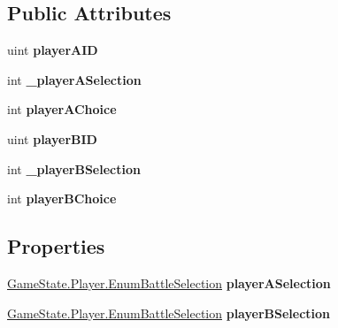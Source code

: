 \subsection*{Public Attributes}
\begin{DoxyCompactItemize}
\item 
\hypertarget{class_event_battle_prompt_selection_a3a3a30b00d2cbb9e1fd3658667b5f0bf}{uint {\bfseries player\-A\-I\-D}}\label{class_event_battle_prompt_selection_a3a3a30b00d2cbb9e1fd3658667b5f0bf}

\item 
\hypertarget{class_event_battle_prompt_selection_adb27194b379be6543169a2a56e47eabb}{int {\bfseries \-\_\-player\-A\-Selection}}\label{class_event_battle_prompt_selection_adb27194b379be6543169a2a56e47eabb}

\item 
\hypertarget{class_event_battle_prompt_selection_a2a6c2af764a1838c48c1ecafdfc0a0f0}{int {\bfseries player\-A\-Choice}}\label{class_event_battle_prompt_selection_a2a6c2af764a1838c48c1ecafdfc0a0f0}

\item 
\hypertarget{class_event_battle_prompt_selection_ab50685401b7d5cc0491616b1515a66cb}{uint {\bfseries player\-B\-I\-D}}\label{class_event_battle_prompt_selection_ab50685401b7d5cc0491616b1515a66cb}

\item 
\hypertarget{class_event_battle_prompt_selection_acd387c1dfc6906e2c69bc9cc7e6febf6}{int {\bfseries \-\_\-player\-B\-Selection}}\label{class_event_battle_prompt_selection_acd387c1dfc6906e2c69bc9cc7e6febf6}

\item 
\hypertarget{class_event_battle_prompt_selection_a7792914c7817740ed88e6d6f5f2a5356}{int {\bfseries player\-B\-Choice}}\label{class_event_battle_prompt_selection_a7792914c7817740ed88e6d6f5f2a5356}

\end{DoxyCompactItemize}
\subsection*{Properties}
\begin{DoxyCompactItemize}
\item 
\hypertarget{class_event_battle_prompt_selection_a137eb22d4fd75f6dad9c3138803b1ca2}{\hyperlink{struct_game_state_1_1_player_a9f54c5eca1e60acbaa2074e981f51615}{Game\-State.\-Player.\-Enum\-Battle\-Selection} {\bfseries player\-A\-Selection}}\label{class_event_battle_prompt_selection_a137eb22d4fd75f6dad9c3138803b1ca2}

\item 
\hypertarget{class_event_battle_prompt_selection_a4c9ef4993da9b8ca79ef969eef61c2e4}{\hyperlink{struct_game_state_1_1_player_a9f54c5eca1e60acbaa2074e981f51615}{Game\-State.\-Player.\-Enum\-Battle\-Selection} {\bfseries player\-B\-Selection}}\label{class_event_battle_prompt_selection_a4c9ef4993da9b8ca79ef969eef61c2e4}

\end{DoxyCompactItemize}
